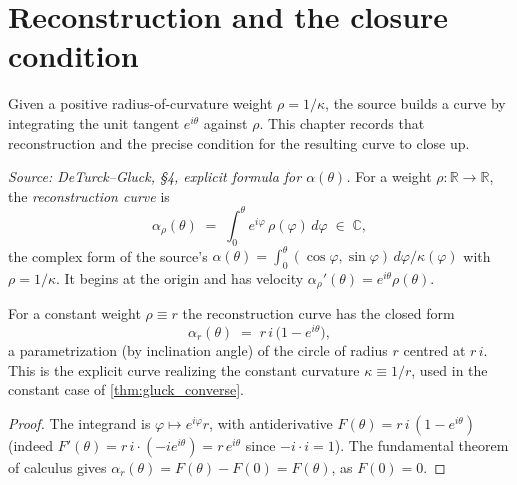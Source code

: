 \chapter{Reconstruction and the closure condition}
\label{chap:closure}


Given a positive radius-of-curvature weight $\rho = 1/\kappa$, the source builds
a curve by integrating the unit tangent $e^{i\theta}$ against $\rho$. This
chapter records that reconstruction and the precise condition for the resulting
curve to close up.

\begin{definition}
  \label{def:reconstruct}
  \textit{Source: DeTurck--Gluck, §4, explicit formula for $\alpha(\theta)$.}
  For a weight $\rho : \mathbb{R} \to \mathbb{R}$, the \emph{reconstruction
  curve} is
  \[
    \alpha_\rho(\theta) \;=\; \int_0^\theta e^{i\varphi}\,\rho(\varphi)\,d\varphi
      \;\in\; \mathbb{C},
  \]
  the complex form of the source's $\alpha(\theta) = \int_0^\theta (\cos\varphi,
  \sin\varphi)\,d\varphi/\kappa(\varphi)$ with $\rho = 1/\kappa$. It begins at the
  origin and has velocity $\alpha_\rho'(\theta) = e^{i\theta}\rho(\theta)$.
\end{definition}

\begin{lemma}

  \label{lem:reconstruct_const}
  For a constant weight $\rho \equiv r$ the reconstruction curve has the closed
  form
  \[
    \alpha_{r}(\theta) \;=\; r\,i\,\bigl(1 - e^{i\theta}\bigr),
  \]
  a parametrization (by inclination angle) of the circle of radius $r$ centred at
  $r\,i$. This is the explicit curve realizing the constant curvature
  $\kappa \equiv 1/r$, used in the constant case of \cref{thm:gluck_converse}.
\end{lemma}
\begin{proof}
  \leanok
  The integrand is $\varphi \mapsto e^{i\varphi}r$, with antiderivative
  $F(\theta) = r\,i\,(1 - e^{i\theta})$ (indeed $F'(\theta) = r\,i\cdot(-i
  e^{i\theta}) = r\,e^{i\theta}$ since $-i\cdot i = 1$). The fundamental theorem of
  calculus gives $\alpha_r(\theta) = F(\theta) - F(0) = F(\theta)$, as
  $F(0) = 0$.
\end{proof}

